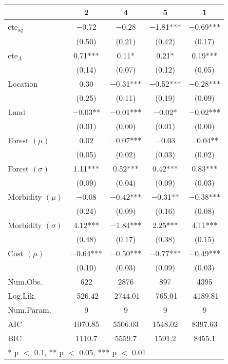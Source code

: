\begin{table}
\centering
\begin{tabular}[t]{lcccc}
\toprule
  & 2 & 4 & 5 & 1\\
\midrule
cte$_{sq}$ & \num{-0.72} & \num{-0.28} & \num{-1.81}*** & \num{-0.69}***\\
 & (\num{0.50}) & (\num{0.21}) & (\num{0.42}) & (\num{0.17})\\
cte$_{A}$ & \num{0.71}*** & \num{0.11}* & \num{0.21}* & \num{0.19}***\\
 & (\num{0.14}) & (\num{0.07}) & (\num{0.12}) & (\num{0.05})\\
Location & \num{0.30} & \num{-0.31}*** & \num{-0.52}*** & \num{-0.28}***\\
 & (\num{0.25}) & (\num{0.11}) & (\num{0.19}) & (\num{0.09})\\
Land & \num{-0.03}** & \num{-0.01}*** & \num{-0.02}* & \num{-0.02}***\\
 & (\num{0.01}) & (\num{0.00}) & (\num{0.01}) & (\num{0.00})\\
Forest $(\mu)$ & \num{0.02} & \num{-0.07}*** & \num{-0.03} & \num{-0.04}**\\
 & (\num{0.05}) & (\num{0.02}) & (\num{0.03}) & (\num{0.02})\\
Forest $(\sigma)$ & \num{1.11}*** & \num{0.52}*** & \num{0.42}*** & \num{0.83}***\\
 & (\num{0.09}) & (\num{0.04}) & (\num{0.09}) & (\num{0.03})\\
Morbidity $(\mu)$ & \num{-0.08} & \num{-0.42}*** & \num{-0.31}** & \num{-0.38}***\\
 & (\num{0.24}) & (\num{0.09}) & (\num{0.16}) & (\num{0.08})\\
Morbidity $(\sigma)$ & \num{4.12}*** & \num{-1.84}*** & \num{2.25}*** & \num{4.11}***\\
 & (\num{0.48}) & (\num{0.17}) & (\num{0.38}) & (\num{0.15})\\
Cost $(\mu)$ & \num{-0.64}*** & \num{-0.50}*** & \num{-0.77}*** & \num{-0.49}***\\
 & (\num{0.10}) & (\num{0.03}) & (\num{0.09}) & (\num{0.03})\\
Num.Obs. & 622 & 2876 & 897 & 4395\\
Log.Lik. & -526.42 & -2744.01 & -765.01 & -4189.81\\
Num.Param. & 9 & 9 & 9 & 9\\
AIC & 1070.85 & 5506.03 & 1548.02 & 8397.63\\
BIC & 1110.7 & 5559.7 & 1591.2 & 8455.1\\
\bottomrule
\multicolumn{5}{l}{\rule{0pt}{1em}* p $<$ 0.1, ** p $<$ 0.05, *** p $<$ 0.01}\\
\end{tabular}
\end{table}
